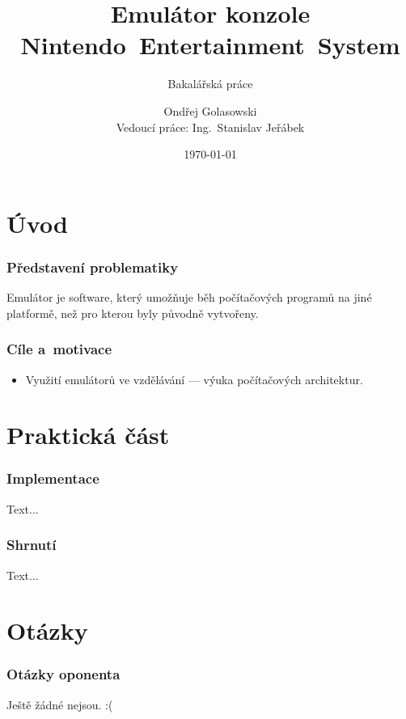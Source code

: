 \documentclass{beamer}
\title[Emulátor konzole NES]{Emulátor konzole Nintendo~Entertainment~System}
\subtitle{Bakalářská práce}
\author[Ondřej Golasowski]{Ondřej Golasowski\texorpdfstring{\\}{}Vedoucí práce: Ing.~Stanislav Jeřábek}
\institute[FIT ČVUT]{Katedra číslicového návrhu, FIT ČVUT}
\date{\today}
\begin{document}
	
\begingroup
{}
\begin{frame}[noframenumbering]
	\titlepage
\end{frame}
\endgroup

\section{Úvod}
\begin{frame}
	\frametitle{Představení problematiky}
	\begin{definice}[Emulátor]
		Emulátor je software, který umožňuje běh počítačových programů na jiné platformě, než pro kterou byly původně vytvořeny.
	\end{definice}
\end{frame}

\begin{frame}
	\frametitle{Cíle a~motivace}
	\begin{itemize}
		\item Využití emulátorů ve vzdělávání --- výuka počítačových architektur.
	\end{itemize}
\end{frame}

\section{Praktická část}
\begin{frame}
	\frametitle{Implementace}
	Text...
\end{frame}

\begin{frame}
	\frametitle{Shrnutí}
	Text...
\end{frame}

\appendix

\section{Otázky}
\begin{frame}
	\frametitle{Otázky oponenta}
	Ještě žádné nejsou. :(
\end{frame}
	
\end{document}
